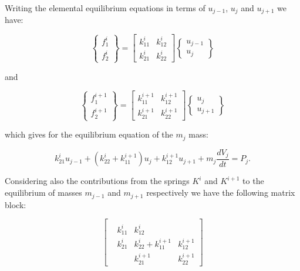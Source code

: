 Writing the elemental equilibrium equations in terms of $u_{j - 1}$, $u_j$ and $u_{j + 1}$ we have:

\[\left\{ {\begin{array}{*{20}{c}}
{f_1^i}\\
{f_2^i}
\end{array}} \right\} = \left[ {\begin{array}{*{20}{c}}
{k_{11}^i}&{k_{12}^i}\\
{k_{21}^i}&{k_{22}^i}
\end{array}} \right]\left\{ {\begin{array}{*{20}{c}}
{{u_{j - 1}}}\\
{{u_j}}
\end{array}} \right\}\]

and

\[\left\{ {\begin{array}{*{20}{c}}
{f_1^{i + 1}}\\
{f_2^{i + 1}}
\end{array}} \right\} = \left[ {\begin{array}{*{20}{c}}
{k_{11}^{i + 1}}&{k_{12}^{i + 1}}\\
{k_{21}^{i + 1}}&{k_{22}^{i + 1}}
\end{array}} \right]\left\{ {\begin{array}{*{20}{c}}
{{u_j}}\\
{{u_{j + 1}}}
\end{array}} \right\}\]

which gives for the equilibrium equation of the $m_j$ mass:

\[k_{21}^i{u_{j - 1}} + (k_{22}^i + k_{11}^{i + 1}){u_j} + k_{12}^{i + 1}{u_{j + 1}} + {m_j}\frac{{d{V_j}}}{{dt}} = {P_j}.\]

Considering also the contributions from the springs $K^i$ and $K^{i+1}$ to the equilibrium of masses $m_{j-1}$ and $m_{j+1}$ respectively we have the following matrix block:



\[\left[ {\begin{array}{*{20}{c}}
{}&{}&{}&{}\\
{}&{k_{11}^i}&{k_{12}^i}&{}\\
{}&{k_{21}^i}&{k_{22}^i + k_{11}^{i + 1}}&{k_{12}^{i + 1}}\\
{}&{}&{k_{21}^{i + 1}}&{k_{22}^{i + 1}}
\end{array}} \right]\]


